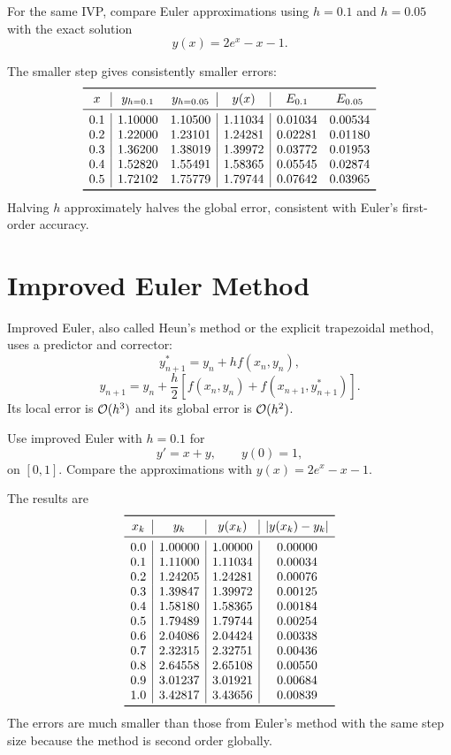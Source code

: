 \begin{example}
For the same IVP, compare Euler approximations using $h=0.1$ and $h=0.05$ with the exact solution
\[
 y(x)=2e^x-x-1.
\]
\end{example}

\begin{solution}[5.5cm]
The smaller step gives consistently smaller errors:
\[
\begin{array}{c|cc|c|cc}
\toprule
x&y_{h=0.1}&y_{h=0.05}&y(x)&E_{0.1}&E_{0.05}\\
\midrule
0.1&1.10000&1.10500&1.11034&0.01034&0.00534\\
0.2&1.22000&1.23101&1.24281&0.02281&0.01180\\
0.3&1.36200&1.38019&1.39972&0.03772&0.01953\\
0.4&1.52820&1.55491&1.58365&0.05545&0.02874\\
0.5&1.72102&1.75779&1.79744&0.07642&0.03965\\
\bottomrule
\end{array}
\]
Halving $h$ approximately halves the global error, consistent with Euler's first-order accuracy.
\end{solution}

\section{Improved Euler Method}

Improved Euler, also called Heun's method or the explicit trapezoidal method, uses a predictor and corrector:
\[
 y_{n+1}^{*}=y_n+hf(x_n,y_n),
\]
\[
 y_{n+1}=y_n+\frac h2
 \left[f(x_n,y_n)+f(x_{n+1},y_{n+1}^{*})\right].
\]
Its local error is $\mathcal O(h^3)$ and its global error is $\mathcal O(h^2)$.

\begin{example}
Use improved Euler with $h=0.1$ for
\[
 y'=x+y,
 \qquad y(0)=1,
\]
on $[0,1]$.  Compare the approximations with $y(x)=2e^x-x-1$.
\end{example}

\begin{solution}[10.0cm]
The results are
\[
\begin{array}{c|c|c|c}
\toprule
x_k&y_k&y(x_k)&|y(x_k)-y_k|\\
\midrule
0.0&1.00000&1.00000&0.00000\\
0.1&1.11000&1.11034&0.00034\\
0.2&1.24205&1.24281&0.00076\\
0.3&1.39847&1.39972&0.00125\\
0.4&1.58180&1.58365&0.00184\\
0.5&1.79489&1.79744&0.00254\\
0.6&2.04086&2.04424&0.00338\\
0.7&2.32315&2.32751&0.00436\\
0.8&2.64558&2.65108&0.00550\\
0.9&3.01237&3.01921&0.00684\\
1.0&3.42817&3.43656&0.00839\\
\bottomrule
\end{array}
\]
The errors are much smaller than those from Euler's method with the same step size because the method is second order globally.
\end{solution}

